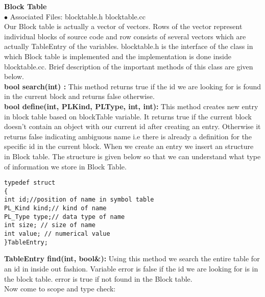 \documentclass[paper=letter, fontsize=12pt]{scrartcl} %
\begin{document}
{\bf Block Table}\\
$\bullet$ Associated Files: blocktable.h blocktable.cc\\
Our Block table is actually a vector of vectors. Rows of the vector represent individual blocks of source code and row consists of several vectors which are actually TableEntry of the variables. blocktable.h is the interface of the class in which Block table is implemented and the implementation is done inside blocktable.cc. Brief description of the important methods of this class are given below.\\
{\bf bool search(int) :} This method returns true if the id we are looking for is found in the current block and returns false otherwise.\\
{\bf bool define(int, PL\textunderscore Kind, PL\textunderscore Type, int, int):} This method creates new entry in block table based on blockTable variable. It returns true if the current block doesn't contain an object with our current id after creating an entry. Otherwise it returns false indicating ambiguous name i.e there is already a definition for the specific id 
in the current block. When we create an entry we insert an structure in Block table. The structure is given below so that we can understand what type of information we store in Block Table.\\

\begin{lstlisting}
typedef struct
{
int id;//position of name in symbol table
PL_Kind kind;// kind of name
PL_Type type;// data type of name
int size; // size of name
int value; // numerical value
}TableEntry;
\end{lstlisting}
\pagebreak
{\bf TableEntry find(int, bool\&):} Using this method we search the entire table for an id in inside out fashion. Variable error is false if the id we are looking for is in
the block table. error is true if not found in the Block table.\\

Now come to scope and type check:\\
\end{document}
